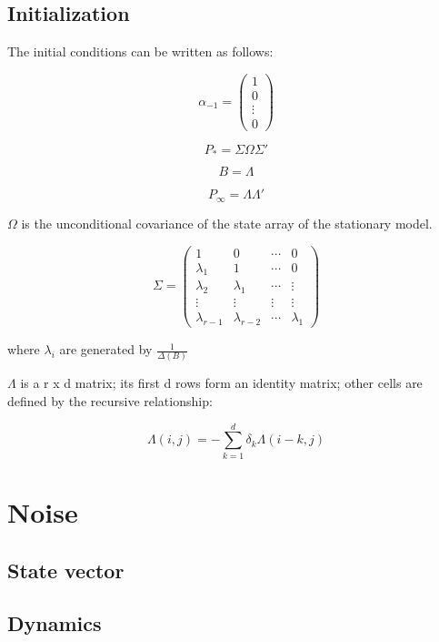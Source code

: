 \documentclass[
  letterpaper,
  DIV=11,
  numbers=noendperiod]{scrreprt}
\begin{document}
\subsection{Initialization}\label{initialization-3}

The initial conditions can be written as follows:

\[ \alpha_{-1} = \begin{pmatrix}1 \\ 0 \\ \vdots\\ 0 \end{pmatrix} \]

\[ P_{*} = \Sigma \Omega \Sigma' \]

\[ B = \Lambda \]

\[ P_{\infty}= \Lambda \Lambda' \]

\(\Omega\) is the unconditional covariance of the state array of the
stationary model.

\[ \Sigma = \begin{pmatrix} 1 & 0 & \cdots & 0 \\ \lambda_1 & 1 & \cdots & 0 \\ \lambda_2 & \lambda_1 & \cdots & \vdots\\ \vdots & \vdots & \vdots & \vdots \\ \lambda_{r-1} & \lambda_{r-2} & \cdots & \lambda_{1} \end{pmatrix} \]

where \(\lambda_{i}\) are generated by
\(\frac{1}{\Delta\left(B\right)}\)

\(\Lambda\) is a r x d matrix; its first d rows form an identity matrix;
other cells are defined by the recursive relationship:

\[\Lambda \left(i,j\right) = -\sum_{k=1}^d {\delta_k \Lambda \left(i-k,j\right)}\]

\section{Noise}\label{noise}

\subsection{State vector}\label{state-vector-3}

\subsection{Dynamics}\label{dynamics-3}
\end{document}
